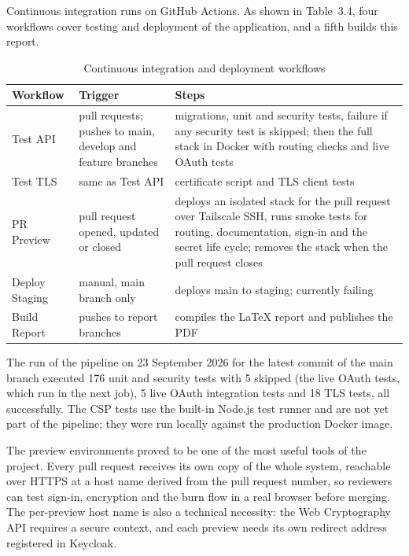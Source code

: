 \documentclass[12pt,a4paper]{article}
\numberwithin{equation}{section}
\numberwithin{figure}{section}
\numberwithin{table}{section}
\newcommand{\tablesetup}{\fontsize{11pt}{13pt}\selectfont\singlespacing\renewcommand{\arraystretch}{1.15}}
\newcommand{\leadin}[1]{%
  {\onehalfspacing\setlength{\parindent}{1.25cm}\indent #1\par}\vspace{8pt}}
\begin{document}
\begin{table}[H]
\leadin{Continuous integration runs on GitHub Actions. As shown in Table~3.4, four workflows cover testing and deployment of the application, and a fifth builds this report.}
\tablesetup
\caption{Continuous integration and deployment workflows}
\label{tab:ci}
\begin{tabularx}{\textwidth}{|P{0.20\textwidth}|P{0.26\textwidth}|L|}
\hline
\textbf{Workflow} & \textbf{Trigger} & \textbf{Steps} \\ \hline
Test API & pull requests; pushes to main, develop and feature branches & migrations, unit and security tests, failure if any security test is skipped; then the full stack in Docker with routing checks and live OAuth tests \\ \hline
Test TLS & same as Test API & certificate script and TLS client tests \\ \hline
PR Preview & pull request opened, updated or closed & deploys an isolated stack for the pull request over Tailscale SSH, runs smoke tests for routing, documentation, sign-in and the secret life cycle; removes the stack when the pull request closes \\ \hline
Deploy Staging & manual, main branch only & deploys main to staging; currently failing \\ \hline
Build Report & pushes to report branches & compiles the LaTeX report and publishes the PDF \\ \hline
\end{tabularx}
\end{table}

The run of the pipeline on 23 September 2026 for the latest commit of the main branch executed 176 unit and security tests with 5 skipped (the live OAuth tests, which run in the next job), 5 live OAuth integration tests and 18 TLS tests, all successfully. The CSP tests use the built-in Node.js test runner and are not yet part of the pipeline; they were run locally against the production Docker image.

The preview environments proved to be one of the most useful tools of the project. Every pull request receives its own copy of the whole system, reachable over HTTPS at a host name derived from the pull request number, so reviewers can test sign-in, encryption and the burn flow in a real browser before merging. The per-preview host name is also a technical necessity: the Web Cryptography API requires a secure context, and each preview needs its own redirect address registered in Keycloak.
\end{document}
